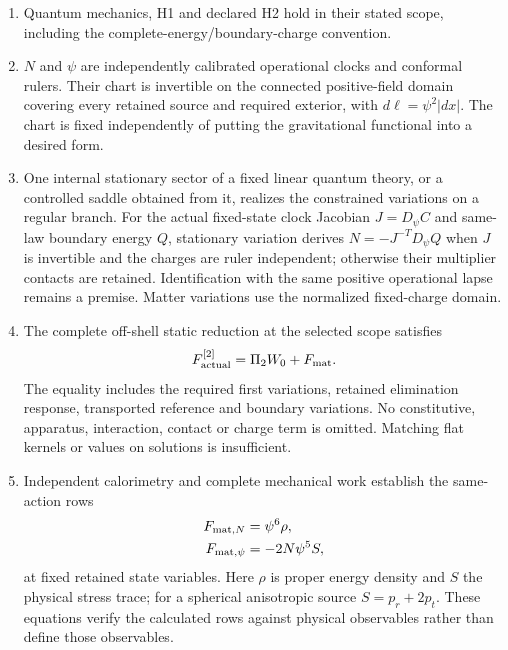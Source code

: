 \begin{enumerate}[label=(\arabic*)]
 \item Quantum mechanics, H1 and declared H2 hold in their stated
 scope, including the complete-energy/boundary-charge convention.

 \item $N$ and $\psi$ are independently calibrated operational clocks
 and conformal rulers.  Their chart is invertible on the connected
 positive-field domain covering every retained source and required
 exterior, with $d\ell=\psi^2|dx|$.  The chart is fixed independently
 of putting the gravitational functional into a desired form.

 \item One internal stationary sector of a fixed linear quantum
 theory, or a controlled saddle obtained from it, realizes the
 constrained variations on a regular branch.  For the actual
 fixed-state clock Jacobian $J=D_\psi C$ and same-law boundary
 energy $Q$, stationary variation derives
 $N=-J^{-T}D_\psi Q$ when $J$ is invertible and the charges are
 ruler independent; otherwise their multiplier contacts are retained.
 Identification with the same positive operational lapse remains
 a premise.  Matter variations use the normalized fixed-charge domain.

 \item The complete off-shell static reduction at the selected scope
 satisfies
 \[
 F_{\rm actual}^{[2]}=\Pi_2 W_0+F_{\rm mat}.
 \]
 The equality includes the required first variations, retained
 elimination response, transported reference and boundary variations.
 No constitutive, apparatus, interaction, contact or charge term is
 omitted.  Matching flat kernels or values on solutions is insufficient.

 \item Independent calorimetry and complete mechanical work establish
 the same-action rows
 \[
 \begin{aligned}
 F_{{\rm mat},N}&=\psi^6\rho,\\
 F_{{\rm mat},\psi}&=-2N\psi^5S,
 \end{aligned}
 \]
 at fixed retained state variables.  Here $\rho$ is proper energy
 density and $S$ the physical stress trace; for a spherical anisotropic
 source $S=p_r+2p_t$.  These equations verify the calculated rows
 against physical observables rather than define those observables.


\end{enumerate}
